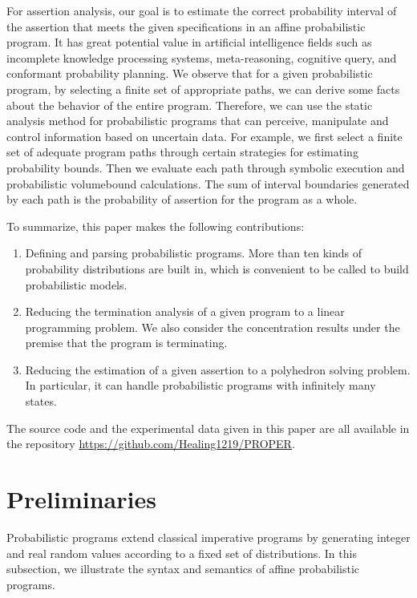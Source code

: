 \documentclass[runningheads]{llncs}
\begin{document}
For assertion analysis, our goal is to estimate the correct probability interval of the assertion that meets the given specifications in an affine probabilistic program. It has great potential value in artificial intelligence fields such as incomplete knowledge processing systems, meta-reasoning, cognitive query, and conformant probability planning. %
We observe that for a given probabilistic program, by selecting a finite set of appropriate paths, we can derive some facts about the behavior of the entire program. Therefore, we can use the static analysis method for probabilistic programs that can perceive, manipulate and control information based on uncertain data. For example, we first select a finite set of adequate program paths through certain strategies for estimating probability bounds. Then we evaluate each path through symbolic execution and probabilistic volumebound calculations. The sum of interval boundaries generated by each path is the probability of assertion for the program as a whole.

To summarize, this paper makes the following contributions:
\begin{enumerate}
	\item Defining and parsing probabilistic programs. More than ten kinds of probability distributions are built in, which is convenient to be called to build probabilistic models.
	\item Reducing the termination analysis of a given program to a linear programming problem. We also consider the concentration results under the premise that the program is terminating.
	\item Reducing the estimation of a given assertion to a polyhedron solving problem. In particular, it can handle probabilistic programs with infinitely many states.	
\end{enumerate}

The source code and the experimental data given in this paper are all available in the repository \url{https://github.com/Healing1219/PROPER}.

\section{Preliminaries}
Probabilistic programs extend classical imperative programs by generating integer and real random values according to a fixed set of distributions. In this subsection, we illustrate the syntax and semantics of affine probabilistic programs.
\end{document}
